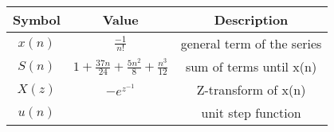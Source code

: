 \begin{tabular}{|c|c|c|}
    \hline
    	\textbf{Symbol} & \textbf{Value} & \textbf{Description} \\
    \hline
	  $x(n)$ & $\frac{-1}{n!}$ & general term of the series \\
    \hline
    	  $S(n)$ & $1 + \frac{37n}{24} + \frac{5n^2}{8} + \frac{n^3}{12}$ & sum of terms until x(n) \\
    \hline
	  $X(z)$ & $- e^{z^{-1}}$ & Z-transform of x(n) \\
    \hline 
	  $u(n)$ & & unit step function \\
    \hline
  \end{tabular}
